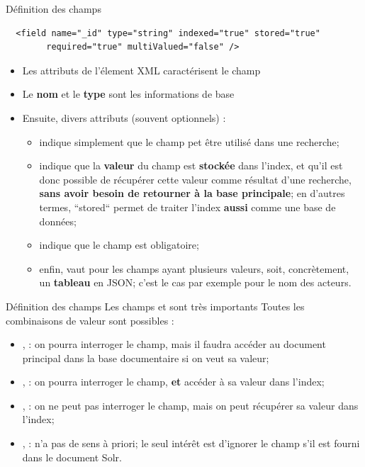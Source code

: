\begin{frame}[fragile]{Définition des champs}
\begin{verbatim}
  <field name="_id" type="string" indexed="true" stored="true" 
        required="true" multiValued="false" />
\end{verbatim}
\smallskip
\begin{itemize}
  \item Les attributs de l'élement XML caractérisent le champ
  \item  Le {\bf nom} et le {\bf type} sont les informations de base
  \item Ensuite, divers attributs (souvent optionnels) :
    \begin{itemize}
      \item {} indique simplement que le champ pet être utilisé dans une recherche;  
      \item {} indique que la {\bf valeur} du champ est {\bf stockée} dans l'index,
            et qu'il est donc possible de récupérer cette valeur comme résultat
            d'une recherche, {\bf sans avoir besoin de retourner à la base principale};
            en d'autres termes, ``stored`` permet de traiter l'index {\bf aussi} comme une
            base de données;
      \item {} indique que le champ est obligatoire;
      \item enfin,  vaut  pour les champs ayant plusieurs
    valeurs, soit, concrètement, un {\bf tableau} en JSON; c'est le
    cas par exemple pour le nom des acteurs.
    \end{itemize}
    \end{itemize}
\end{frame}
\begin{frame}[fragile]{Définition des champs}
 Les champs   et  sont très
        importants
\vfill
Toutes les combinaisons de valeur sont possibles :
    \begin{itemize}
      \item {}, : on pourra interroger
      le champ, mais il faudra accéder au document principal dans la  base documentaire si on veut sa valeur;
    \item {}, : on pourra interroger
      le champ, {\bf et} accéder à sa valeur dans l'index;
    \item {}, : on ne peut pas interroger le champ, mais
      on peut récupérer sa valeur dans l'index;
    \item {}, : n'a pas de sens à priori; le seul intérêt
      est d'ignorer le champ s'il est fourni dans le document Solr.
    \end{itemize}

\end{frame}


